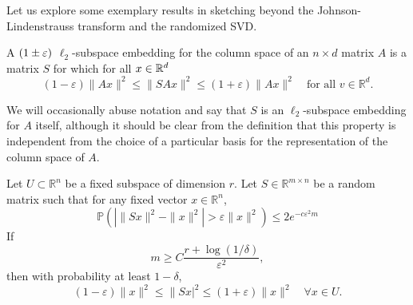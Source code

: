 Let us explore some exemplary results in sketching beyond the Johnson-Lindenstrauss transform and the randomized SVD.

\begin{definition}
A $(1\pm \varepsilon)$ $\ell_2$-subspace embedding for the column space of an $n \times d$ matrix $A$ is a matrix $S$ for which for all $x \in \mathbb{R}^d$
$$
(1-\varepsilon)\|Ax\|^2 \le \|SAx\|^2 \le (1+\varepsilon)\|Ax\|^2
\quad \text{for all } v \in \mathbb{R}^d.
$$
\end{definition}

We will occasionally abuse notation and say that $S$ is an $\ell_2$-subspace embedding for $A$ itself, although it should be clear from the definition that this property is independent from the choice of a particular basis for the representation
of the column space of $A$.


\begin{theorem}\label{th:subspaceembedding} 
Let $U \subset \mathbb{R}^n$ be a fixed subspace of dimension $r$.
Let $S \in \mathbb{R}^{m \times n}$ be a random matrix such that for any fixed vector $x \in \mathbb{R}^n$,
$$
\mathbb{P}\left( \left| \|Sx\|^2 - \|x\|^2 \right| > \varepsilon \|x\|^2 \right)
\le 2e^{-c\varepsilon^2 m}
$$
If
$$
m \ge C \frac{r + \log(1/\delta)}{\varepsilon^2},
$$
then with probability at least $1-\delta$,
$$
(1-\varepsilon)\|x\|^2 \le \|Sx|^2 \le (1+\varepsilon)\|x\|^2
\quad \forall x \in U.
$$
\end{theorem}

